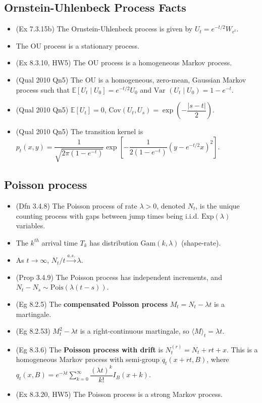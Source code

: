 \documentclass[twoside]{article}
\newcommand{\dis}{\displaystyle}
\newcommand\bbE{\mathbb{E}}
\newcommand\lmb{\lambda}
\newcommand\goesto{\rightarrow}
\newcommand\var{\text{Var }}
\begin{document}
\subsection*{Ornstein-Uhlenbeck Process Facts}
\begin{itemize}
\item (Ex 7.3.15b) The Ornstein-Uhlenbeck process is given by $U_t = e^{-t/2}W_{e^t}$.

\item The OU process is a stationary process.

\item (Ex 8.3.10, HW5) The OU process is a homogeneous Markov process.

\item (Qual 2010 Qn5) The OU is a homogeneous, zero-mean, Gaussian Markov process such that $\bbE [U_t \mid U_0] = e^{-t/2} U_0$ and $\var (U_t \mid U_0) = 1 - e^{-t}$.

\item (Qual 2010 Qn5) $\bbE [U_t] = 0$, $\text{Cov}(U_t, U_s) = \exp \left( - \dfrac{|s-t|}{2} \right)$.

\item (Qual 2010 Qn5) The transition kernel is $p_t(x,y) = \dfrac{1}{\sqrt{2\pi(1 - e^{-t})}} \exp \left[ - \dfrac{1}{2(1-e^{-t})}(y - e^{-t/2}x)^2 \right]$.
\end{itemize}

\subsection*{Poisson process}
\begin{itemize}
\item (Dfn 3.4.8) The Poisson process of rate $\lmb > 0$, denoted $N_t$, is the unique counting process with gaps between jump times being i.i.d. $\text{Exp}(\lmb)$ variables.

\item The $k^{th}$ arrival time $T_k$ has distribution $\text{Gam}(k, \lmb)$ (shape-rate).

\item As $t \goesto \infty$, $N_t/t \stackrel{a.s.}{\goesto} \lmb$.

\item (Prop 3.4.9) The Poisson process has independent increments, and $N_t - N_s \sim \text{Pois}(\lmb(t-s))$.

\item (Eg 8.2.5) The \textbf{compensated Poisson process} $M_t = N_t - \lmb t$ is a martingale.

\item (Eg 8.2.53) $M_t^2 - \lmb t$ is a right-continuous martingale, so $\langle M \rangle_t = \lmb t$.

\item (Eg 8.3.6) The \textbf{Poisson process with drift} is $N_t^{(r)} = N_t + rt + x$. This is a homogeneous Markov process with semi-group $q_t(x + rt, B)$, where $q_t(x, B) = e^{-\lmb t} \dis\sum_{k=0}^\infty \dfrac{(\lmb t)^k}{k!} I_B(x+k)$.

\item (Ex 8.3.20, HW5) The Poisson process is a strong Markov process.

\end{itemize}
\end{document}
